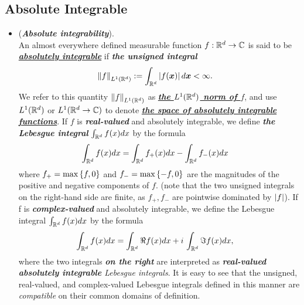 \documentclass[11pt]{article}
\begin{document}
\subsection{Absolute Integrable}
\begin{itemize}
\item \begin{definition} (\emph{\textbf{Absolute integrability}}).\\
 An almost everywhere defined measurable function $f : {\mathbb R}^d \rightarrow {\mathbb C}$ is said to be \underline{\emph{\textbf{absolutely integrable}}} if \emph{\textbf{the unsigned integral}}
\begin{align*}
\left\|f\right\|_{L^{1}({\mathbb R}^{d})} &:= \int_{{\mathbb R}^{d}}\left\lvert f(\boldsymbol{x}) \right\rvert d\boldsymbol{x} < \infty.
\end{align*}
We refer to this quantity $\left\|f\right\|_{L^{1}({\mathbb R}^{d})}$ as \underline{\emph{\textbf{the $L^1({\mathbb R}^d)$ norm of $f$}}}, and use \underline{$L^1({\mathbb R}^d)$} or $L^1({\mathbb R}^d \rightarrow {\mathbb C})$ to denote \underline{\emph{\textbf{the space of absolutely integrable functions}}}. If $f$ is \emph{\textbf{real-valued}} and absolutely integrable, we define \emph{\textbf{the Lebesgue integral}} $\int_{{\mathbb R}^{d}}f(x)dx$ by the formula
\begin{align*}
\int_{{\mathbb R}^{d}}f(x)dx &= \int_{{\mathbb R}^{d}}f_{+}(x)dx - \int_{{\mathbb R}^{d}}f_{-}(x)dx
\end{align*}
where $f_{+} = \max\left\{f, 0\right\}$ and $f_{-} = \max\left\{-f, 0\right\}$ are the magnitudes of the positive and negative components of $f$. (note that the two unsigned integrals on the right-hand side are finite, as $f_+, f_{-}$ are pointwise dominated by $\left\lvert f \right\rvert$). If f is \emph{\textbf{complex-valued}} and absolutely integrable, we define the Lebesgue integral $\int_{{\mathbb R}^{d}}f(x)dx$ by the formula
\begin{align*}
\int_{{\mathbb R}^{d}}f(x)dx &= \int_{{\mathbb R}^{d}}\Re f(x)dx + i\,\int_{{\mathbb R}^{d}}\Im f(x)dx,
\end{align*}
where the two integrals \emph{\textbf{on the right}} are interpreted as \emph{\textbf{real-valued absolutely integrable} Lebesgue integrals}. It is easy to see that the unsigned, real-valued, and complex-valued Lebesgue integrals defined in this manner are \emph{compatible} on their common domains of definition.
\end{definition}


\end{itemize}
\end{document}
